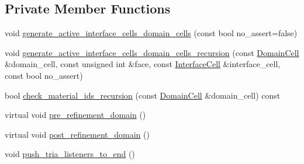 \subsection*{Private Member Functions}
\begin{DoxyCompactItemize}
\item 
void \hyperlink{class_triangulation_system_a4214cf789cf39910305db9fe554249a0}{generate\+\_\+active\+\_\+interface\+\_\+cells\+\_\+domain\+\_\+cells} (const bool no\+\_\+assert=false)
\item 
void \hyperlink{class_triangulation_system_a449457dd44d9c9d9aaa5754532e8537e}{generate\+\_\+active\+\_\+interface\+\_\+cells\+\_\+domain\+\_\+cells\+\_\+recursion} (const \hyperlink{class_triangulation_system_af53de5ec80a16d9cb167660b2832b240}{Domain\+Cell} \&domain\+\_\+cell, const unsigned int \&face, const \hyperlink{class_triangulation_system_a1d62a56e335cf19f4a4ec7932fbaef09}{Interface\+Cell} \&interface\+\_\+cell, const bool no\+\_\+assert)
\item 
bool \hyperlink{class_triangulation_system_a677ea8e08a897b475375eaf4ef70be37}{check\+\_\+material\+\_\+ids\+\_\+recursion} (const \hyperlink{class_triangulation_system_af53de5ec80a16d9cb167660b2832b240}{Domain\+Cell} \&domain\+\_\+cell) const 
\item 
virtual void \hyperlink{class_triangulation_system_ae1862e6da3157dc8d539fdc0439e9f48}{pre\+\_\+refinement\+\_\+domain} ()
\item 
virtual void \hyperlink{class_triangulation_system_a8435489384095f687363d200ccfce628}{post\+\_\+refinement\+\_\+domain} ()
\item 
void \hyperlink{class_triangulation_system_aca3dc94f1006a603f56ac12c730ae242}{push\+\_\+tria\+\_\+listeners\+\_\+to\+\_\+end} ()
\end{DoxyCompactItemize}
